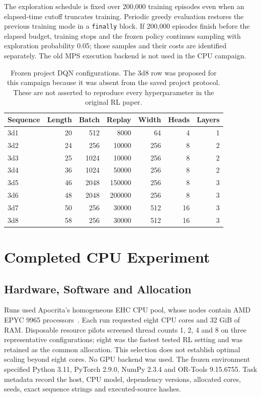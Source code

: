 \documentclass{article}
\theoremstyle{plain}
\theoremstyle{definition}
\begin{document}
The exploration schedule is fixed over 200,000 training episodes even when an elapsed-time cutoff truncates training. Periodic greedy evaluation restores the previous training mode in a \texttt{finally} block. If 200,000 episodes finish before the elapsed budget, training stops and the frozen policy continues sampling with exploration probability 0.05; those samples and their costs are identified separately. The old MPS execution backend is not used in the CPU campaign.

\begin{table}[htbp]
\centering
\caption{Frozen project DQN configurations. The 3d8 row was proposed for this campaign because it was absent from the saved project protocol. These are not asserted to reproduce every hyperparameter in the original RL paper.}\label{tab:cluster_configs}
\begin{tabular}{lrrrrrr}
\toprule
Sequence & Length & Batch & Replay & Width & Heads & Layers \\
\midrule
3d1 & 20 & 512 & 8000 & 64 & 4 & 1 \\
3d2 & 24 & 256 & 10000 & 256 & 8 & 2 \\
3d3 & 25 & 1024 & 10000 & 256 & 8 & 2 \\
3d4 & 36 & 1024 & 50000 & 256 & 8 & 2 \\
3d5 & 46 & 2048 & 150000 & 256 & 8 & 3 \\
3d6 & 48 & 2048 & 200000 & 256 & 8 & 3 \\
3d7 & 50 & 256 & 30000 & 512 & 16 & 3 \\
3d8 & 58 & 256 & 30000 & 512 & 16 & 3 \\
\bottomrule
\end{tabular}
\end{table}

\section{Completed CPU Experiment}\label{sec:protocol}
\subsection{Hardware, Software and Allocation}
Runs used Apocrita's homogeneous EHC CPU pool, whose nodes contain AMD EPYC 9965 processors~\cite{ApocritaEHC}. Each run requested eight CPU cores and 32 GiB of RAM. Disposable resource pilots screened thread counts 1, 2, 4 and 8 on three representative configurations; eight was the fastest tested RL setting and was retained as the common allocation. This selection does not establish optimal scaling beyond eight cores. No GPU backend was used. The frozen environment specified Python 3.11, PyTorch 2.9.0, NumPy 2.3.4 and OR-Tools 9.15.6755. Task metadata record the host, CPU model, dependency versions, allocated cores, seeds, exact sequence strings and executed-source hashes.
\end{document}
